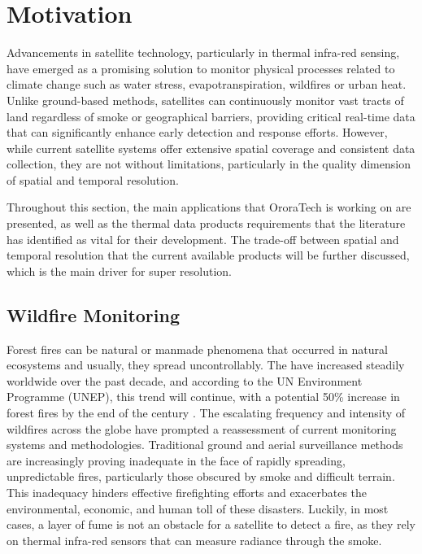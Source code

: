     
    \newpage
    

\section{Motivation}

Advancements in satellite technology, particularly in thermal infra-red sensing, have emerged as a promising solution to monitor physical processes related to climate change such as water stress, evapotranspiration, wildfires or urban heat.
Unlike ground-based methods, satellites can continuously monitor vast tracts of land regardless of smoke or geographical barriers, providing critical real-time data that can significantly enhance early detection and response efforts. 
However, while current satellite systems offer extensive spatial coverage and consistent data collection, they are not without limitations, particularly in the quality dimension of spatial and temporal resolution.

Throughout this section, the main applications that OroraTech is working on are presented, as well as the thermal data products requirements that the literature has identified as vital for their development.
The trade-off between spatial and temporal resolution that the current available products will be further discussed, which is the main driver for super resolution.
    

    \subsection{Wildfire Monitoring}

    Forest fires can be natural or manmade phenomena that occurred in natural ecosystems and usually, they spread uncontrollably.
    The have increased steadily worldwide over the past decade, and according to the UN Environment Programme (UNEP), this trend will continue, with a potential 50\% increase in forest fires by the end of the century \cite{UNEP2021Wildfire}. 
    The escalating frequency and intensity of wildfires across the globe have prompted a reassessment of current monitoring systems and methodologies. Traditional ground and aerial surveillance methods are increasingly proving inadequate in the face of rapidly spreading, unpredictable fires, particularly those obscured by smoke and difficult terrain. This inadequacy hinders effective firefighting efforts and exacerbates the environmental, economic, and human toll of these disasters. 
    Luckily, in most cases, a layer of fume is not an obstacle for a satellite to detect a fire, as they rely on thermal infra-red sensors that can measure radiance through the smoke.

